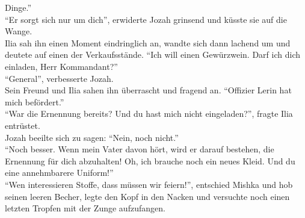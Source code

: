 Dinge.''\\
``Er sorgt sich nur um dich'', erwiderte Jozah grinsend und küsste sie auf die Wange.\\
Ilia sah ihn einen Moment eindringlich an, wandte sich dann lachend um und deutete auf einen der 
Verkaufsstände. ``Ich will einen Gewürzwein. Darf ich dich einladen, Herr Kommandant?''\\
``General'', verbesserte Jozah.\\
Sein Freund und Ilia sahen ihn überrascht und fragend an. ``Offizier Lerin hat mich befördert.''\\
``War die Ernennung bereits? Und du hast mich nicht eingeladen?'', fragte Ilia entrüstet.\\
Jozah beeilte sich zu sagen: ``Nein, noch nicht.''\\
``Noch besser. Wenn mein Vater davon hört, wird er darauf bestehen, die Ernennung für dich 
abzuhalten! Oh, ich brauche noch ein neues Kleid. Und du eine annehmbarere Uniform!''\\
``Wen interessieren Stoffe, dass müssen wir feiern!'', entschied Mishka und hob seinen leeren 
Becher, legte den Kopf in den Nacken und versuchte noch einen letzten Tropfen mit der Zunge 
aufzufangen.\\
